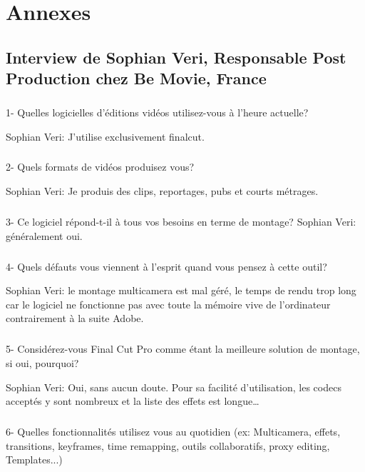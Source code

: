 \newpage

\chapter*{Annexes}
\section*{Interview de Sophian Veri,
Responsable Post Production chez Be Movie, France}

\paragraph{}
1-  Quelles logicielles d'éditions vidéos utilisez-vous à l'heure actuelle?

Sophian Veri: J'utilise exclusivement finalcut.

\paragraph{}
2- Quels formats de vidéos produisez vous?

Sophian Veri: Je produis des clips, reportages, pubs et courts métrages.

\paragraph{}
3- Ce logiciel répond-t-il à tous vos besoins en terme de montage?
Sophian Veri: généralement oui.

\paragraph{}
4- Quels défauts vous viennent à l'esprit quand vous pensez à cette outil?

Sophian Veri: le montage multicamera est mal géré, le temps de rendu trop long car le
logiciel ne fonctionne pas avec toute la mémoire vive de l'ordinateur
contrairement à la suite Adobe.

\paragraph{}
5- Considérez-vous Final Cut Pro comme étant la meilleure solution de montage,
si oui, pourquoi?

Sophian Veri: Oui, sans aucun doute. Pour sa facilité d'utilisation,
les codecs acceptés y sont nombreux et la liste des effets est
longue\ldots

\paragraph{}
6-  Quelles fonctionnalités utilisez vous au quotidien (ex: Multicamera, effets,
transitions, keyframes, time remapping, outils collaboratifs, proxy
editing, Templates...)

